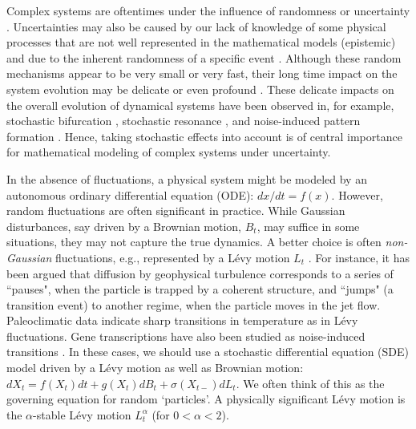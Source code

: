 \documentclass[11pt]{NSFamsart}
\begin{document}
Complex systems are oftentimes under the influence of randomness or uncertainty \cite{Moss1, Horst, Gar, VanKampen3}. Uncertainties may also be caused by our lack of knowledge of some physical processes that are not well represented in the mathematical models (epistemic) and due to the inherent randomness of a specific event  \cite{Palmer1, Kantz, Wilks, Williams}.
Although these random mechanisms appear to be very small or very fast, their long time impact on the system evolution may be delicate or even profound \cite{Arnold, DuanBook2015}. These delicate impacts on the overall evolution of dynamical systems have been observed in, for example, stochastic bifurcation
\cite{Crauel, CarLanRob01, Horst}, stochastic resonance \cite{imkeller2002model},
 and  noise-induced pattern formation \cite{Gar, blomker2003pattern}.
Hence, taking stochastic effects   into account is of
central importance for mathematical modeling of
complex systems under uncertainty.   

In the absence of fluctuations, a physical system might be modeled by an autonomous ordinary differential equation (ODE): $ dx/dt=f(x)$.  However, random fluctuations are often significant in practice. While Gaussian disturbances, say driven by a  Brownian motion, $B_t$, may suffice in some situations, they may not capture the true dynamics.  A better choice is often \emph{non-Gaussian} fluctuations, e.g., represented by a L\'evy motion $L_t$ \cite{Woy,Dit, Shlesinger,taqqu,dybiec2009levy}. For instance, it has been argued that diffusion by geophysical turbulence \cite{Shlesinger}
corresponds  to a series of  ``pauses", when the
particle is trapped by a coherent structure, and  
``jumps" (a transition event) to another regime, when the particle moves in the jet
flow. Paleoclimatic data \cite{Dit, ZhengYY2020}   indicate   sharp transitions in temperature as in L\'evy fluctuations. Gene transcriptions have also been studied as noise-induced transitions \cite{Raser2005,Suel06,Lin2016GeneED, ChenWuDuan}. 
In these cases, we should use a
 stochastic   differential equation (SDE)  model \cite{Arnold,   Oksendal, DuanBook2015, Applebaum}
 driven by a L\'evy motion as well as Brownian motion:
 $
 dX_t= f(X_t) dt + g(X_t) dB_t + \sigma(X_{t-}) dL_t.
 $
 We often think of this as the governing equation for random `particles'. A physically significant L\'evy motion is the  $\alpha$-stable L\'evy motion $L_t^\alpha$ (for $0<\alpha<2$).  
 
\end{document}
